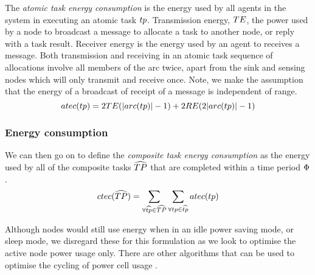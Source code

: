 \newcommand{\functionTaskEnergyConsumption}[2]{
	\functionSignature{atec}
	{\varAtomicTask{}{}}
}
The \textit{atomic task energy consumption} is the energy used by all agents in the system in executing an atomic task $\varAtomicTask{}{}$. Transmission energy, $TE$, the power used by a node to  broadcast a message to allocate a task to another node, or reply with a task result. Receiver energy is the energy used by an agent to receives a message. Both transmission and receiving in an atomic task sequence of allocations involve all members of the arc twice, apart from the sink and sensing nodes which will only transmit and receive once. Note, we make the assumption that the energy of a broadcast of receipt of a message is independent of range. 
\begin{equation}
	\functionTaskEnergyConsumption{}{} 
	= 2\varTransmissionEnergy{}{} (\funcSize{\functionTaskArc{}{}}{} - 1)
	+ 2\varReceiverEnergy{}{} (2 \funcSize{\functionTaskArc{}{}}{} - 1)
\end{equation}
\subsubsection{Energy consumption}
\newcommand{\functionSystemEnergyConsumption}[2]{
	\functionSignature{ctec}
	{\setCompositeTask{}{}}
}
We can then go on to define the \textit{composite task energy consumption} as the energy used by all of the composite tasks $\setCompositeTask{}{}$ that are completed within a time period $\Phi$.
\begin{equation}
	\functionSystemEnergyConsumption{}{} 
	= 
	\sum_{\forall \varCompositeTask{}{} \in \setCompositeTask{}{}}
	\sum_{\forall \varAtomicTask{}{} \in \varCompositeTask{}{}} \functionTaskEnergyConsumption{}{}
\end{equation}

Although nodes would still use energy when in an idle power saving mode, or sleep mode, we disregard these for this formulation as we look to optimise the active node power usage only. There are other algorithms that can be used to optimise the cycling of power cell usage \cite{DUMMY}.